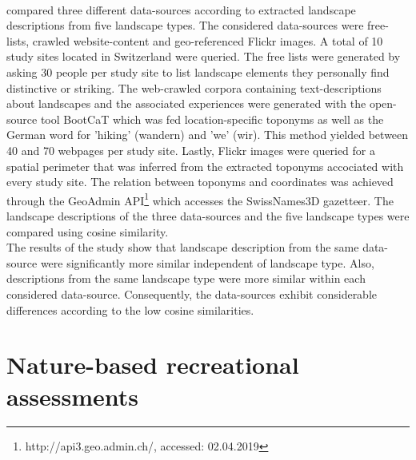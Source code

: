 \paragraph*{\textcite{Wartmann2018}} compared three different data-sources according to extracted landscape descriptions from five landscape types. The considered data-sources were free-lists, crawled website-content and geo-referenced Flickr images. A total of 10 study sites located in Switzerland were queried. The free lists were generated by asking 30 people per study site to list landscape elements they personally find distinctive or striking. The web-crawled corpora containing text-descriptions about landscapes and the associated experiences were generated with the open-source tool BootCaT \parencite{Baroni2004} which was fed location-specific toponyms as well as the German word for 'hiking' (wandern) and 'we' (wir). This method yielded between 40 and 70 webpages per study site. Lastly, Flickr images were queried for a spatial perimeter that was inferred from the extracted toponyms accociated with every study site. The relation between toponyms and coordinates was achieved through the GeoAdmin API\footnote{http://api3.geo.admin.ch/, accessed: 02.04.2019} which accesses the SwissNames3D gazetteer. The landscape descriptions of the three data-sources and the five landscape types were compared using cosine similarity. \\ 
The results of the study show that landscape description from the same data-source were significantly more similar independent of landscape type. Also, descriptions from the same landscape type were more similar within each considered data-source. Consequently, the data-sources exhibit considerable differences according to the low cosine similarities.


\section{Nature-based recreational assessments}

